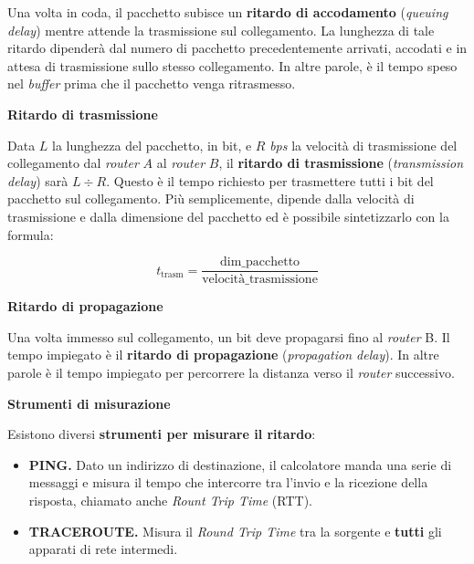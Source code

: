 \documentclass[a4paper]{article}
\begin{document}
	\noindent
	Una volta in coda, il pacchetto subisce un \textbf{ritardo di accodamento} (\emph{queuing delay}) mentre attende la trasmissione sul collegamento. La lunghezza di tale ritardo dipenderà dal numero di pacchetto precedentemente arrivati, accodati e in attesa di trasmissione sullo stesso collegamento. In altre parole, è il tempo speso nel \emph{buffer} prima che il pacchetto venga ritrasmesso.
	
	\begin{flushleft}
		\large \textcolor{Red3}{\textbf{Ritardo di trasmissione}}
	\end{flushleft}
	
	\noindent
	Data $L$ la lunghezza del pacchetto, in bit, e $R$ \emph{bps} la velocità di trasmissione del collegamento dal \emph{router} $A$ al \emph{router} $B$, il \textbf{ritardo di trasmissione} (\emph{transmission delay}) sarà $L\div R$. Questo è il tempo richiesto per trasmettere tutti i bit del pacchetto sul collegamento.\newline
	Più semplicemente, dipende dalla velocità di trasmissione e dalla dimensione del pacchetto ed è possibile sintetizzarlo con la formula:
	
	\begin{equation*}
		t_{\text{trasm}} = \dfrac{\text{dim\_pacchetto}}{\text{velocità\_trasmissione}}
	\end{equation*}
	
	\begin{flushleft}
	\large \textcolor{Red3}{\textbf{Ritardo di propagazione}}
	\end{flushleft}
	
	\noindent
	Una volta immesso sul collegamento, un bit deve propagarsi fino al \emph{router} B. Il tempo impiegato è il \textbf{ritardo di propagazione} (\emph{propagation delay}). In altre parole è il tempo impiegato per percorrere la distanza verso il \emph{router} successivo.
	
	\begin{flushleft}
		\large \textbf{Strumenti di misurazione}
	\end{flushleft}
	
	\noindent
	Esistono diversi \textbf{strumenti per misurare il ritardo}:
	
	\begin{itemize}
		\item \textbf{PING.} Dato un indirizzo di destinazione, il calcolatore manda una serie di messaggi e misura il tempo che intercorre tra l'invio e la ricezione della risposta, chiamato anche \emph{Rount Trip Time} (RTT).
		
		\item \textbf{TRACEROUTE.} Misura il \emph{Round Trip Time} tra la sorgente e \textbf{tutti} gli apparati di rete intermedi.
	\end{itemize}
	
\end{document}
